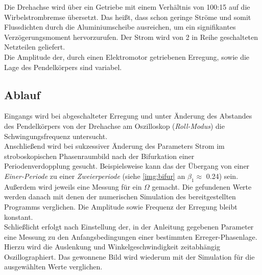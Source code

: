 \documentclass[numbers=noenddot,12pt,a4paper]{scrartcl}
\newcommand{\tilt}[1]{\textit{#1}}
\begin{document}
Die Drehachse wird über ein Getriebe mit einem Verhältnis von 100:15 auf die Wirbelstrombremse übersetzt. Das heißt, dass schon geringe Ströme und somit Flussdichten durch die Aluminiumscheibe ausreichen, um ein signifikantes Verzögerungsmoment hervorzurufen. Der Strom wird von 2 in Reihe geschalteten Netzteilen geliefert.\\
Die Amplitude der, durch einen Elektromotor getriebenen Erregung, sowie die Lage des Pendelkörpers sind variabel. 
\subsection{Ablauf}
Eingangs wird bei abgeschalteter Erregung und unter Änderung des Abstandes des Pendelkörpers von der Drehachse am Oszilloskop (\tilt{Roll-Modus}) die  Schwingungsfrequenz untersucht.\\
Anschließend wird bei sukzessiver Änderung des Parameters Strom im stroboskopischen Phasenraumbild nach der Bifurkation einer Periodenverdopplung gesucht. Beispielsweise kann das der Übergang von einer \tilt{Einer-Periode} zu einer  \tilt{Zweierperiode} (siehe \ref{img:bifur} an $\beta_1\approx$ 0.24) sein. Außerdem wird jeweils eine Messung für ein $\Omega$ gemacht. Die gefundenen Werte werden danach mit denen der numerischen Simulation des bereitgestellten Programms verglichen. Die Amplitude sowie Frequenz der Erregung bleibt konstant.\\
Schließlicht erfolgt nach Einstellung der, in der Anleitung gegebenen Parameter eine Messung zu den Anfangsbedingungen einer bestimmten Erreger-Phasenlage. Hierzu wird die Auslenkung und Winkelgeschwindigkeit zeitabhängig Oszillographiert. Das gewonnene Bild wird wiederum mit der Simulation für die ausgewählten Werte verglichen.
\end{document}
